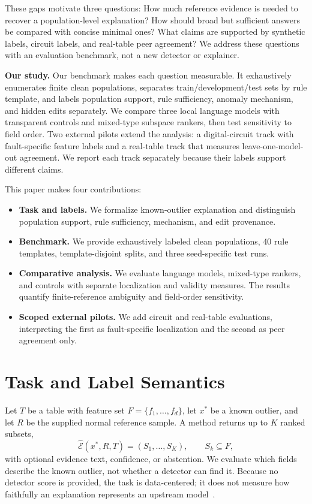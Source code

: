 \documentclass[conference]{IEEEtran}
\begin{document}
These gaps motivate three questions: How much reference evidence is needed to recover a population-level explanation? How should broad but sufficient answers be compared with concise minimal ones? What claims are supported by synthetic labels, circuit labels, and real-table peer agreement? We address these questions with an evaluation benchmark, not a new detector or explainer.

\textbf{Our study.} Our benchmark makes each question measurable. It exhaustively enumerates finite clean populations, separates train/development/test sets by rule template, and labels population support, rule sufficiency, anomaly mechanism, and hidden edits separately. We compare three local language models with transparent controls and mixed-type subspace rankers, then test sensitivity to field order. Two external pilots extend the analysis: a digital-circuit track with fault-specific feature labels and a real-table track that measures leave-one-model-out agreement. We report each track separately because their labels support different claims.

This paper makes four contributions:
\begin{itemize}
  \item \textbf{Task and labels.} We formalize known-outlier explanation and distinguish population support, rule sufficiency, mechanism, and edit provenance.
  \item \textbf{Benchmark.} We provide exhaustively labeled clean populations, 40 rule templates, template-disjoint splits, and three seed-specific test runs.
  \item \textbf{Comparative analysis.} We evaluate language models, mixed-type rankers, and controls with separate localization and validity measures. The results quantify finite-reference ambiguity and field-order sensitivity.
  \item \textbf{Scoped external pilots.} We add circuit and real-table evaluations, interpreting the first as fault-specific localization and the second as peer agreement only.
\end{itemize}


\section{Task and Label Semantics}
Let $T$ be a table with feature set $F=\{f_1,\dots,f_d\}$, let $x^*$ be a known outlier, and let $R$ be the supplied normal reference sample. A method returns up to $K$ ranked subsets,
\[
  \widehat{\mathcal{E}}(x^*,R,T)=(S_1,\ldots,S_K), \qquad S_k\subseteq F,
\]
with optional evidence text, confidence, or abstention. We evaluate which fields describe the known outlier, not whether a detector can find it. Because no detector score is provided, the task is data-centered; it does not measure how faithfully an explanation represents an upstream model~\cite{li2024xadsurvey}.
\end{document}

